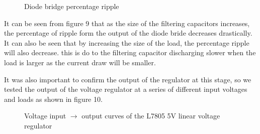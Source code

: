 \documentclass[a4paper,11pt]{article}
\begin{document}
\begin{figure}[h]
 \begin{center}
  \caption{Diode bridge percentage ripple}
 \end{center}
\end{figure}

It can be seen from figure 9 that as the size of the filtering capacitors increases, the percentage of ripple form the output of the diode bride decreases drastically. It can also be seen that by increasing the size of the load, the percentage ripple will also decrease. this is do to the filtering capacitor discharging slower when the load is larger as the current draw will be smaller.

It was also important to confirm the output of the regulator at this stage, so we tested the output of the voltage regulator at a series of different input voltages and loads as shown in figure 10. 

\begin{figure}[h]
 \begin{center}
  \caption{Voltage input $\rightarrow$ output curves of the L7805 5V linear voltage regulator}
 \end{center}
\end{figure}
\end{document}
